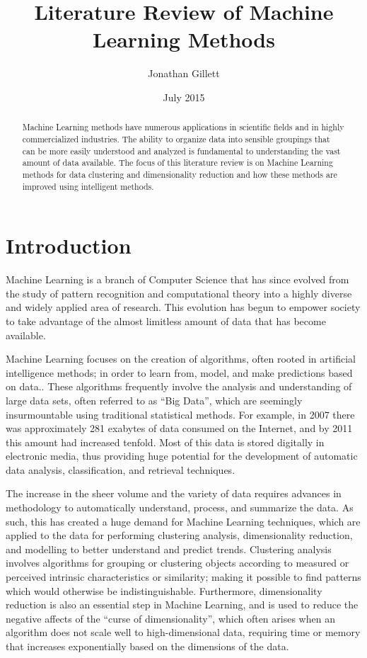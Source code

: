 \documentclass{article}
\title{Literature Review of Machine Learning Methods}
\author{Jonathan Gillett}
\date{July 2015}
\begin{document}
\maketitle

\begin{abstract}

Machine Learning methods have numerous applications in scientific fields and in highly commercialized industries. The ability to organize data into sensible groupings that can be more easily understood and analyzed is fundamental to understanding the vast amount of data available. The focus of this literature review is on Machine Learning methods for data clustering and dimensionality reduction and how these methods are improved using intelligent methods.

\end{abstract}


\section{Introduction}

Machine Learning is a branch of Computer Science that has since evolved from the study of pattern recognition and computational theory into a highly diverse and widely applied area of research. This evolution has begun to empower society to take advantage of the almost limitless amount of data that has become available\cite{lohr2012age, mohri2012foundations}.

Machine Learning focuses on the creation of algorithms, often rooted in artificial intelligence methods; in order to learn from, model, and make predictions based on data.\cite{dietterich2002machine}. These algorithms frequently involve the analysis and understanding of large data sets, often referred to as ``Big Data'', which are seemingly insurmountable using traditional statistical methods\cite{lohr2012age}. For example, in 2007 there was approximately 281 exabytes of data consumed on the Internet, and by 2011 this amount had increased tenfold\cite{jain2010}. Most of this data is stored digitally in electronic media, thus providing huge potential for the development of automatic data analysis, classification, and retrieval techniques.

The increase in the sheer volume and the variety of data requires advances in methodology to automatically understand, process, and summarize the data. As such, this has created a huge demand for Machine Learning techniques, which are applied to the data for performing clustering analysis, dimensionality reduction, and modelling to better understand and predict trends. Clustering analysis involves algorithms for grouping or clustering objects according to measured or perceived intrinsic characteristics or similarity; making it possible to find patterns which would otherwise be indistinguishable\cite{jain2010}. Furthermore, dimensionality reduction is also an essential step in Machine Learning, and is used to reduce the negative affects of the ``curse of dimensionality'', which often arises when an algorithm does not scale well to high-dimensional data, requiring time or memory that increases exponentially based on the dimensions of the data\cite{domingos2012few}. 
\end{document}
